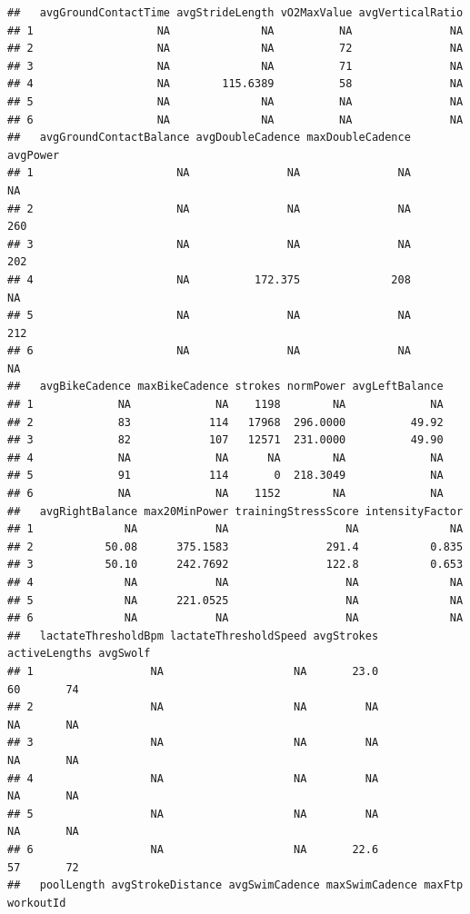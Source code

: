 \documentclass[
]{book}
\begin{document}
\begin{verbatim}
##   avgGroundContactTime avgStrideLength vO2MaxValue avgVerticalRatio
## 1                   NA              NA          NA               NA
## 2                   NA              NA          72               NA
## 3                   NA              NA          71               NA
## 4                   NA        115.6389          58               NA
## 5                   NA              NA          NA               NA
## 6                   NA              NA          NA               NA
##   avgGroundContactBalance avgDoubleCadence maxDoubleCadence avgPower
## 1                      NA               NA               NA       NA
## 2                      NA               NA               NA      260
## 3                      NA               NA               NA      202
## 4                      NA          172.375              208       NA
## 5                      NA               NA               NA      212
## 6                      NA               NA               NA       NA
##   avgBikeCadence maxBikeCadence strokes normPower avgLeftBalance
## 1             NA             NA    1198        NA             NA
## 2             83            114   17968  296.0000          49.92
## 3             82            107   12571  231.0000          49.90
## 4             NA             NA      NA        NA             NA
## 5             91            114       0  218.3049             NA
## 6             NA             NA    1152        NA             NA
##   avgRightBalance max20MinPower trainingStressScore intensityFactor
## 1              NA            NA                  NA              NA
## 2           50.08      375.1583               291.4           0.835
## 3           50.10      242.7692               122.8           0.653
## 4              NA            NA                  NA              NA
## 5              NA      221.0525                  NA              NA
## 6              NA            NA                  NA              NA
##   lactateThresholdBpm lactateThresholdSpeed avgStrokes activeLengths avgSwolf
## 1                  NA                    NA       23.0            60       74
## 2                  NA                    NA         NA            NA       NA
## 3                  NA                    NA         NA            NA       NA
## 4                  NA                    NA         NA            NA       NA
## 5                  NA                    NA         NA            NA       NA
## 6                  NA                    NA       22.6            57       72
##   poolLength avgStrokeDistance avgSwimCadence maxSwimCadence maxFtp workoutId

\end{verbatim}
\end{document}
